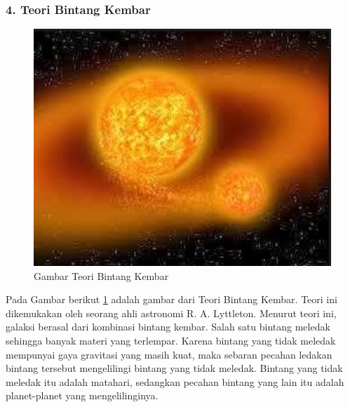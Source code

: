 \subsubsection{4. Teori Bintang Kembar}
\begin{figure} [ht]
	\centerline{\includegraphics[width=1\textwidth]{figures/teoribintangkembar.JPG}}
	\caption{Gambar Teori Bintang Kembar}
	\label{teoribintangkembar}
	\end{figure}
	Pada Gambar berikut \ref{teoribintangkembar} adalah gambar dari Teori Bintang Kembar.
Teori ini dikemukakan oleh seorang ahli astronomi R. A. Lyttleton. Menurut teori ini, galaksi berasal dari kombinasi bintang kembar. Salah satu bintang meledak sehingga banyak materi yang terlempar. Karena bintang yang tidak meledak mempunyai gaya gravitasi yang masih kuat, maka sebaran pecahan ledakan bintang tersebut mengelilingi bintang yang tidak meledak. Bintang yang tidak meledak itu adalah matahari, sedangkan pecahan bintang yang lain itu adalah planet-planet yang mengelilinginya.

